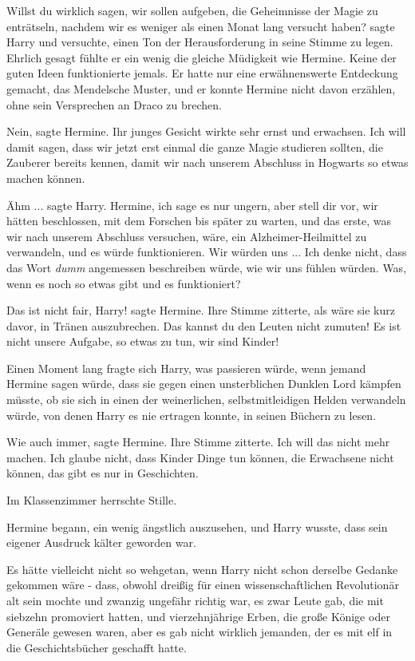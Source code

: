 \glqq{}Willst du wirklich sagen, wir sollen aufgeben, die Geheimnisse der Magie
zu enträtseln, nachdem wir es weniger als einen Monat lang versucht
haben?\grqq{} sagte Harry und versuchte, einen Ton der Herausforderung in seine
Stimme zu legen. Ehrlich gesagt fühlte er ein wenig die gleiche Müdigkeit wie
Hermine. Keine der guten Ideen funktionierte jemals. Er hatte nur eine
erwähnenswerte Entdeckung gemacht, das Mendelsche Muster, und er konnte Hermine
nicht davon erzählen, ohne sein Versprechen an Draco zu brechen.

\glqq{}Nein\grqq{}, sagte Hermine. Ihr junges Gesicht wirkte sehr ernst und
erwachsen. \glqq{}Ich will damit sagen, dass wir jetzt erst einmal die ganze
Magie studieren sollten, die Zauberer bereits kennen, damit wir nach unserem
Abschluss in Hogwarts so etwas machen können.\grqq{}

\glqq{}Ähm ...\grqq{} sagte Harry. \glqq{}Hermine, ich sage es nur ungern, aber
stell dir vor, wir hätten beschlossen, mit dem Forschen bis später zu warten,
und das erste, was wir nach unserem Abschluss versuchen, wäre, ein
Alzheimer-Heilmittel zu verwandeln, und es würde funktionieren. Wir würden
uns ... Ich denke nicht, dass das Wort \emph{\glqq{}dumm\grqq{}} angemessen
beschreiben würde, wie wir uns fühlen würden. Was, wenn es noch so etwas gibt
und es funktioniert?\grqq{}

\glqq{}Das ist nicht fair, Harry!\grqq{} sagte Hermine. Ihre Stimme zitterte,
als wäre sie kurz davor, in Tränen auszubrechen. \glqq{}Das kannst du den Leuten
nicht zumuten! Es ist nicht unsere Aufgabe, so etwas zu tun, wir sind
Kinder!\grqq{}

Einen Moment lang fragte sich Harry, was passieren würde, wenn jemand Hermine
sagen würde, dass sie gegen einen unsterblichen Dunklen Lord kämpfen müsste, ob
sie sich in einen der weinerlichen, selbstmitleidigen Helden verwandeln würde,
von denen Harry es nie ertragen konnte, in seinen Büchern zu lesen.

\glqq{}Wie auch immer\grqq{}, sagte Hermine. Ihre Stimme zitterte. \glqq{}Ich
will das nicht mehr machen. Ich glaube nicht, dass Kinder Dinge tun können, die
Erwachsene nicht können, das gibt es nur in Geschichten.\grqq{}

Im Klassenzimmer herrschte Stille.

Hermine begann, ein wenig ängstlich auszusehen, und Harry wusste, dass sein
eigener Ausdruck kälter geworden war.

Es hätte vielleicht nicht so wehgetan, wenn Harry nicht schon derselbe Gedanke
gekommen wäre - dass, obwohl dreißig für einen wissenschaftlichen Revolutionär
alt sein mochte und zwanzig ungefähr richtig war, es zwar Leute gab, die mit
siebzehn promoviert hatten, und vierzehnjährige Erben, die große Könige oder
Generäle gewesen waren, aber es gab nicht wirklich jemanden, der es mit elf in
die Geschichtsbücher geschafft hatte.

